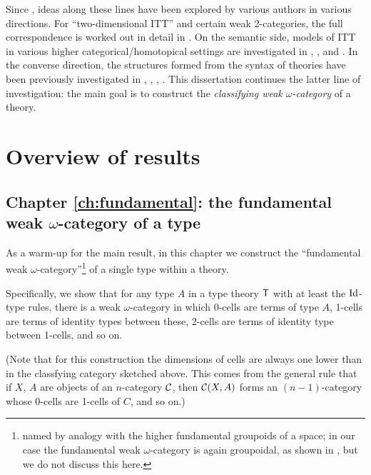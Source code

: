 \begin{para}
Since \cite{hofmann-streicher}, ideas along these lines have been explored by various authors in various directions.  For ``two-dimensional ITT'' and certain weak 2-categories, the full correspondence is worked out in detail in \cite{garner:2d-models}.  On the semantic side, models of ITT in various higher categorical/homotopical settings are investigated in \cite{awodey-warren}, \cite{warren:thesis}, and \cite{garner-van-den-berg:models}.  In the converse direction, the structures formed from the syntax of theories have been previously investigated in \cite{gambino-garner}, \cite{lumsdaine:lmcs}, \cite{garner-van-den-berg}, \cite{awodey-hofstra-warren}.  This dissertation continues the latter line of investigation: the main goal is to construct the \emph{classifying weak $\omega$-category} of a theory.
\end{para}


\section{Overview of results}

\subsection*{Chapter \ref{ch:fundamental}: the fundamental weak $\omega$-category of a type}

\begin{para}As a warm-up for the main result, in this chapter we construct the ``fundamental weak $\omega$-category''\footnote{named by analogy with the higher fundamental groupoids of a space; in our case the fundamental weak $\omega$-category is again groupoidal, as shown in \cite{garner-van-den-berg}, but we do not discuss this here.} of a single type within a theory.  

Specifically, we show that for any type $A$ in a type theory $\mathsf{T}$ with at least the $\mathrm{Id}$-type rules, there is a weak $\omega$-category in which 0-cells are terms of type $A$, 1-cells are terms of identity types between these, 2-cells are terms of identity type between 1-cells, and so on.

(Note that for this construction the dimensions of cells are always one lower than in the classfying category sketched above.  This comes from the general rule that if $X$, $A$ are objects of an $n$-category $\mathcal{C}$, then $\mathcal{C}(X,A)$ forms an $(n-1)$-category whose 0-cells are 1-cells of $C$, and so on.)
\end{para}

